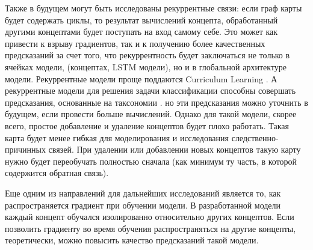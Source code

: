 Также в будущем могут быть исследованы рекуррентные связи:
если граф карты будет содержать циклы, то результат вычислений
концепта, обработанный другими концептами будет поступать на вход
самому себе. Это может как привести к взрыву градиентов, так и к
получению более качественных предсказаний за счет того, что рекуррентность
будет заключаться не только в ячейках модели, (концептах, LSTM модели), но и в
глобальной архитектуре модели. Рекуррентные модели проще поддаются Curriculum Learning \cite{bengio2009curriculum, curriculum_taxonomy}.
А рекуррентные модели для решения задачи классификации способны совершать
предсказания, основанные на таксономии \cite{curriculum_taxonomy}.
но эти предсказания можно уточнить в будущем, если провести больше вычислений.
Однако для такой модели, скорее всего,
простое добавление и удаление концептов будет плохо работать. Такая карта будет
менее гибкая для моделирования и исследования следственно-причинных связей.
При удалении или добавлении новых концептов такую карту нужно будет переобучать полностью
сначала (как минимум ту часть, в которой содержится обратная связь).

Еще одним из направлений для дальнейших исследований является то,
как распространяется градиент при обучении модели. В разработанной
модели каждый концепт обучался изолированно относительно других концептов.
Если позволить градиенту во время обучения распространяться на другие
концепты, теоретически, можно повысить качество предсказаний такой модели.
